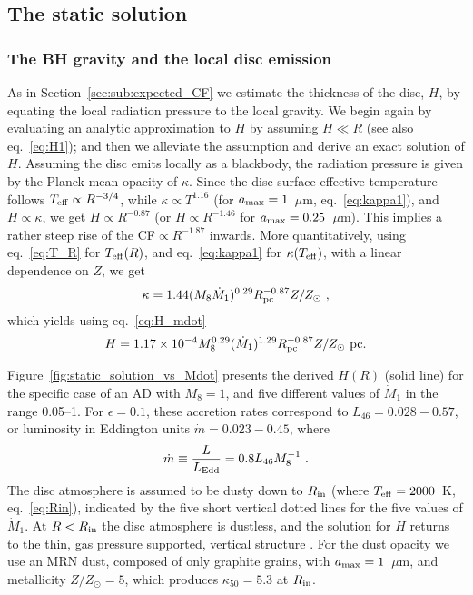 \documentclass[a4paper,fleqn,usenatbib]{mnras}
\newcommand{\mdot}{\dot{M}}
\newcommand{\mic}{\mbox{$\mu$m}}
\begin{document}
\subsection{The static solution}\label{sec:static_model}
\subsubsection{The BH gravity and the local disc emission}

As in Section~\ref{sec:sub:expected_CF} we estimate the thickness of the disc, $H$, by equating the local radiation pressure to the local gravity. We begin again by evaluating an analytic approximation to $H$ by assuming $H\ll R$ (see also eq.~\ref{eq:H1}); and then we alleviate the assumption and derive an exact solution of $H$. Assuming the disc emits locally as a blackbody, the radiation pressure is given by the Planck mean opacity of $\kappa$.
 Since the disc surface effective temperature follows $T_{\rm eff}\propto R^{-3/4}$, while  $\kappa\propto T^{1.16}$
(for $a_{\rm max}=1$~\mic, eq.~\ref{eq:kappa1}), and $H\propto \kappa$, we get $H\propto R^{-0.87}$
(or $H\propto R^{-1.46}$ for $a_{\rm max}=0.25$~\mic). This
implies a rather steep rise of the CF$\propto R^{-1.87}$ inwards. 
More quantitatively, using eq.~\ref{eq:T_R} for $T_{\rm eff}(R)$, and eq.~\ref{eq:kappa1} for 
$\kappa(T_{\rm eff})$, with a linear dependence on $Z$, we get
\begin{equation}
\kappa=1.44(M_8\mdot_1)^{0.29}R_{\rm pc}^{-0.87}Z/Z_{\odot}\ ,
\end{equation}
which yields using eq.~\ref{eq:H_mdot}
\begin{equation}
H=1.17\times 10^{-4}M_8^{0.29}(\mdot_1)^{1.29}R_{\rm pc}^{-0.87}Z/Z_{\odot}~{\rm pc}.
\label{eq:H_mdot1}
\end{equation}

Figure~\ref{fig:static_solution_vs_Mdot} presents the derived $H(R)$ (solid line) for the
 specific case of an AD with $M_8=1$, and five different values of $\mdot_1$ in the range 0.05--1.
For $\epsilon=0.1$, these accretion rates correspond to $L_{46}=0.028-0.57$, or luminosity
in Eddington units $\dot{m}=0.023-0.45$, where 
\begin{equation} 
\dot{m}\equiv \frac{L}{L_{\rm Edd}}=0.8L_{46}M_8^{-1}\ .
\end{equation} 
The disc atmosphere is assumed to be dusty down to $R_{\rm in}$ 
(where $T_{\rm eff}=2000$~K, eq.~\ref{eq:Rin}), indicated by the five short vertical dotted lines 
for the five values of $\mdot_1$. At $R<R_{\rm in}$ the disc atmosphere is dustless,
and the solution for $H$ returns to the thin, gas pressure supported, vertical structure \citep{SS73}.
For the dust opacity we use an MRN dust, composed of
only graphite grains, with $a_{\rm max}=1$~\mic, and metallicity $Z/Z_\odot=5$,
which produces $\kappa_{50}=5.3$ at $R_{\rm in}$.  
\end{document}
